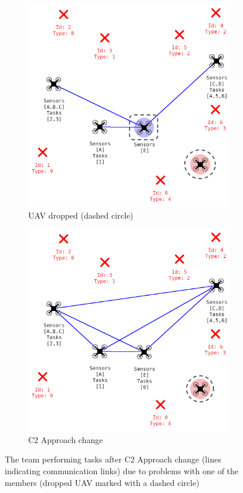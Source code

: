 \begin{figure}[!htbp]
	\centering
	\begin{subfigure}[t]{.45\textwidth}
	\centering
	    \includegraphics[width=0.95\linewidth]{img/C2Drones2-V4-dashed.png}
	    \caption{UAV dropped (dashed circle)\label{fig:example2-a}}
	\end{subfigure}
	\begin{subfigure}[t]{.45\textwidth}
	\centering
	    \includegraphics[width=0.95\linewidth]{img/C2Drones3-V4-dashed.png}
	    \caption{C2 Approach change \label{fig:example2-b}}
	\end{subfigure}
	\caption{The team performing tasks after C2 Approach change (lines indicating communication links) due to problems with one of the members (dropped UAV marked with a dashed circle)}
	\label{fig:TeamExecutionAfterManuever}
\end{figure}

